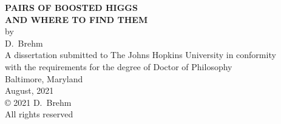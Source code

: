 \thispagestyle{empty}
\baselineskip=18pt
\begin{center}
\vspace*{3\baselineskip}
%
{\bfseries  PAIRS OF BOOSTED HIGGS \\AND WHERE TO FIND THEM}\\[6\baselineskip]
%
by\\
%
D.~Brehm\\[3\baselineskip]
%
%
A dissertation submitted to The Johns Hopkins University in conformity\\
with the requirements for the degree of Doctor of Philosophy\\[4\baselineskip]
%
Baltimore, Maryland\\
August, 2021\\[6\baselineskip]
%
{\copyright{} 2021 D.~Brehm\\
All rights reserved}
%
\end{center}
%
\baselineskip=24pt
\newpage 
